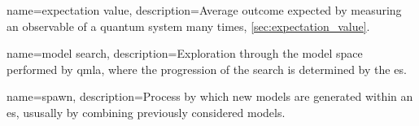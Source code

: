 





{
    name=expectation value,
    description={Average outcome expected by measuring an observable of a quantum system many times, \cref{sec:expectation_value}.}
}

{
    name=model search,
    description={Exploration through the \gls{model space} performed by \acrshort{qmla}, where the progression of the search is determined by the \acrshort{es}.}
}

{
    name=spawn,
    description={Process by which new models are generated within an \acrshort{es}, ususally by combining previously considered models.}
}

